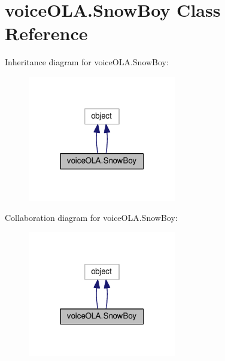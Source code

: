 \hypertarget{classvoiceOLA_1_1SnowBoy}{}\section{voice\+O\+L\+A.\+Snow\+Boy Class Reference}
\label{classvoiceOLA_1_1SnowBoy}


Inheritance diagram for voice\+O\+L\+A.\+Snow\+Boy\+:
\nopagebreak
\begin{figure}[H]
\begin{center}
\leavevmode
\includegraphics[width=184pt]{classvoiceOLA_1_1SnowBoy__inherit__graph}
\end{center}
\end{figure}


Collaboration diagram for voice\+O\+L\+A.\+Snow\+Boy\+:
\nopagebreak
\begin{figure}[H]
\begin{center}
\leavevmode
\includegraphics[width=184pt]{classvoiceOLA_1_1SnowBoy__coll__graph}
\end{center}
\end{figure}
